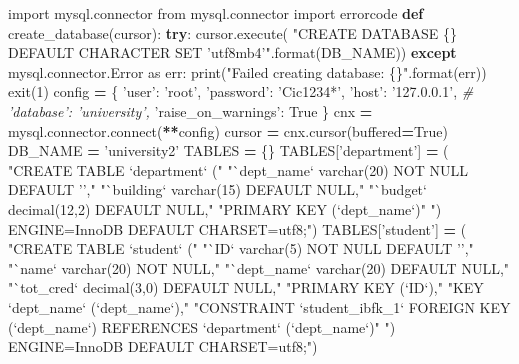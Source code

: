 \documentclass[]{article}
\newenvironment{Shaded}{\begin{snugshade}}{\end{snugshade}}
\newcommand{\KeywordTok}[1]{\textcolor[rgb]{0.13,0.29,0.53}{\textbf{#1}}}
\newcommand{\DecValTok}[1]{\textcolor[rgb]{0.00,0.00,0.81}{#1}}
\newcommand{\SpecialCharTok}[1]{\textcolor[rgb]{0.00,0.00,0.00}{#1}}
\newcommand{\StringTok}[1]{\textcolor[rgb]{0.31,0.60,0.02}{#1}}
\newcommand{\ImportTok}[1]{#1}
\newcommand{\CommentTok}[1]{\textcolor[rgb]{0.56,0.35,0.01}{\textit{#1}}}
\newcommand{\VariableTok}[1]{\textcolor[rgb]{0.00,0.00,0.00}{#1}}
\newcommand{\ControlFlowTok}[1]{\textcolor[rgb]{0.13,0.29,0.53}{\textbf{#1}}}
\newcommand{\OperatorTok}[1]{\textcolor[rgb]{0.81,0.36,0.00}{\textbf{#1}}}
\newcommand{\BuiltInTok}[1]{#1}
\newcommand{\ExtensionTok}[1]{#1}
\newcommand{\NormalTok}[1]{#1}
\begin{document}
\begin{Shaded}
\begin{Highlighting}[]
\ImportTok{import}\NormalTok{ mysql.connector}
\ImportTok{from}\NormalTok{ mysql.connector }\ImportTok{import}\NormalTok{ errorcode}
\KeywordTok{def}\NormalTok{ create_database(cursor):}
    \ControlFlowTok{try}\NormalTok{:}
\NormalTok{        cursor.execute(}
            \StringTok{"CREATE DATABASE }\SpecialCharTok{\{\}}\StringTok{ DEFAULT CHARACTER SET 'utf8mb4'"}\NormalTok{.}\BuiltInTok{format}\NormalTok{(DB_NAME))}
    \ControlFlowTok{except}\NormalTok{ mysql.connector.Error }\ImportTok{as}\NormalTok{ err:}
        \BuiltInTok{print}\NormalTok{(}\StringTok{"Failed creating database: }\SpecialCharTok{\{\}}\StringTok{"}\NormalTok{.}\BuiltInTok{format}\NormalTok{(err))}
\NormalTok{        exit(}\DecValTok{1}\NormalTok{)}
\NormalTok{config }\OperatorTok{=}\NormalTok{ \{}
  \StringTok{'user'}\NormalTok{: }\StringTok{'root'}\NormalTok{,}
  \StringTok{'password'}\NormalTok{: }\StringTok{'Cic1234*'}\NormalTok{,}
  \StringTok{'host'}\NormalTok{: }\StringTok{'127.0.0.1'}\NormalTok{,}
\CommentTok{# 'database': 'university',}
  \StringTok{'raise_on_warnings'}\NormalTok{: }\VariableTok{True}
\NormalTok{\}}
\NormalTok{cnx }\OperatorTok{=}\NormalTok{ mysql.connector.}\ExtensionTok{connect}\NormalTok{(}\OperatorTok{**}\NormalTok{config)}
\NormalTok{cursor }\OperatorTok{=}\NormalTok{ cnx.cursor(buffered}\OperatorTok{=}\VariableTok{True}\NormalTok{)}
\NormalTok{DB_NAME }\OperatorTok{=} \StringTok{'university2'}
\NormalTok{TABLES }\OperatorTok{=}\NormalTok{ \{\}}
\NormalTok{TABLES[}\StringTok{'department'}\NormalTok{] }\OperatorTok{=}\NormalTok{ (}
    \StringTok{"CREATE TABLE `department` ("}
    \StringTok{"`dept_name` varchar(20) NOT NULL DEFAULT '',"}
    \StringTok{"`building` varchar(15) DEFAULT NULL,"}
    \StringTok{"`budget` decimal(12,2) DEFAULT NULL,"}
    \StringTok{"PRIMARY KEY (`dept_name`)"}
    \StringTok{") ENGINE=InnoDB DEFAULT CHARSET=utf8;"}\NormalTok{)}
\NormalTok{TABLES[}\StringTok{'student'}\NormalTok{] }\OperatorTok{=}\NormalTok{ (}
\StringTok{"CREATE TABLE `student` ("}
      \StringTok{"`ID` varchar(5) NOT NULL DEFAULT '',"}
     \StringTok{"`name` varchar(20) NOT NULL,"}
     \StringTok{"`dept_name` varchar(20) DEFAULT NULL,"}
     \StringTok{"`tot_cred` decimal(3,0) DEFAULT NULL,"}
     \StringTok{"PRIMARY KEY (`ID`),"}
     \StringTok{"KEY `dept_name` (`dept_name`),"}
    \StringTok{"CONSTRAINT `student_ibfk_1` FOREIGN KEY (`dept_name`) REFERENCES `department` (`dept_name`)"}
    \StringTok{") ENGINE=InnoDB DEFAULT CHARSET=utf8;"}\NormalTok{)}

\end{Highlighting}
\end{Shaded}
\end{document}
